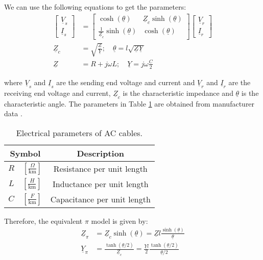 \documentclass[a4paper,11pt, titlepage, twoside]{article}
\begin{document}
We can use the following equations \cite{paperbase} to get the parameters:
\begin{align}
\begin{bmatrix}
\underline{V}_s \\
\underline{I}_s
\end{bmatrix}
&=
\begin{bmatrix}
\cosh(\underline{\theta}) & \underline{Z}_c \sinh(\underline{\theta}) \\
\frac{1}{\underline{Z}_c} \sinh(\underline{\theta}) & \cosh(\underline{\theta})
\end{bmatrix}
\begin{bmatrix}
\underline{V}_r \\
\underline{I}_r
\end{bmatrix} \\
\underline{Z}_c &= \sqrt{\frac{\underline{Z}}{\underline{Y}}}; \quad \underline{\theta} = l\sqrt{\underline{Z}\underline{Y}} \\
\underline{Z} &= R + j\omega L; \quad \underline{Y} = j\omega\frac{C}{2}
\end{align}

where $\underline{V}_s$ and $\underline{I}_s$ are the sending end voltage and current and $\underline{V}_r$ and $\underline{I}_r$ are the receiving end voltage and current,
$\underline{Z}_c$ is the characteristic impedance and $\underline{\theta}$ is the characteristic angle.
The parameters in Table \ref{tab:parameters} are obtained from manufacturer data \cite{ABB}.


\begin{table}[h]
\centering
\begin{tabular}{|c|c|}
\hline
Symbol & Description \\
\hline
$R \quad \left[\frac{\Omega}{\text{km}}\right]$  & Resistance per unit length \\
$L \quad \left[\frac{H}{\text{km}}\right]$ & Inductance per unit length \\
$C \quad \left[\frac{F}{\text{km}}\right]$ & Capacitance per unit length \\
\hline
\end{tabular}
\caption{Electrical parameters of AC cables.}
\label{tab:parameters}
\end{table} 



Therefore, the equivalent $\pi$ model is given by:
\begin{align}
\underline{Z}_{\pi} &= \underline{Z}_c \sinh(\underline{\theta}) = \underline{Z} l \frac{\sinh(\underline{\theta})}{\underline{\theta}} \\
\underline{Y}_{\pi} &= \frac{\tanh(\underline{\theta}/2)}{\underline{Z}_c} = \frac{\underline{Y} l}{2} \frac{\tanh(\underline{\theta}/2)}{\underline{\theta}/2}
\end{align}
\end{document}
